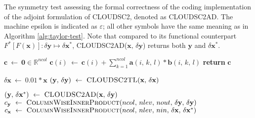 \documentclass[main.tex]{subfiles}
\begin{document}
    \begin{algorithm}[t!]
        \caption{The symmetry test assessing the formal correctness of the coding implementation of the adjoint formulation of CLOUDSC2, denoted as \textsc{CLOUDSC2AD}. The machine epsilon is indicated as $\varepsilon$; all other symbols have the same meaning as in Algorithm \ref{alg:taylor-test}. Note that compared to its functional counterpart $F^* \left[ F \left( \boldsymbol{x} \right) \right] : \delta \boldsymbol{y} \mapsto \delta \boldsymbol{x}^*$, \textsc{CLOUDSC2AD($\mathbf{x}, \, \delta \mathbf{y}$)} returns both $\mathbf{y}$ and $\delta \mathbf{x}^*$.}
        \label{alg:symmetry-test}

        \begin{algorithmic}[1]
             
                \State $\boldsymbol{c} ~ \gets ~ \mathbf{0} \in \mathbb{R}^{ncol}$
                        \State $\boldsymbol{c}(i) ~ \gets ~ \boldsymbol{c}(i) + \sum_{k=1}^{ncol} \mathbf{a} \left( i, \, k, \, l \right) * \mathbf{b} \left( i, \, k, \, l \right)$
                    \EndFor
                \EndFor
                \State \textbf{return} $\boldsymbol{c}$
            \EndFunction

            \Statex

             

            \State $\delta \mathbf{x} ~ \gets ~ 0.01 * \mathbf{x}$
            \State $\left( \mathbf{y}, \, \delta \mathbf{y} \right) ~ \gets ~ \Call{CLOUDSC2TL}{\mathbf{x}, \, \delta \mathbf{x}}$ 

            \State $\left( \mathbf{y}, \, \delta \mathbf{x}^* \right) ~ \gets ~ \Call{CLOUDSC2AD}{\mathbf{x}, \, \delta \mathbf{y}}$ 
            \State $\boldsymbol{c}_{\mathbf{y}} ~ \gets ~ \Call{ColumnWiseInnerProduct}{ncol, \, nlev, \, nout, \, \delta \mathbf{y}, \, \delta \mathbf{y}}$
            \State $\boldsymbol{c}_{\mathbf{x}} ~ \gets ~ \Call{ColumnWiseInnerProduct}{ncol, \, nlev, \, nin, \, \delta \mathbf{x}, \, \delta \mathbf{x}^*}$


\end{algorithmic}
\end{algorithm}
\end{document}
